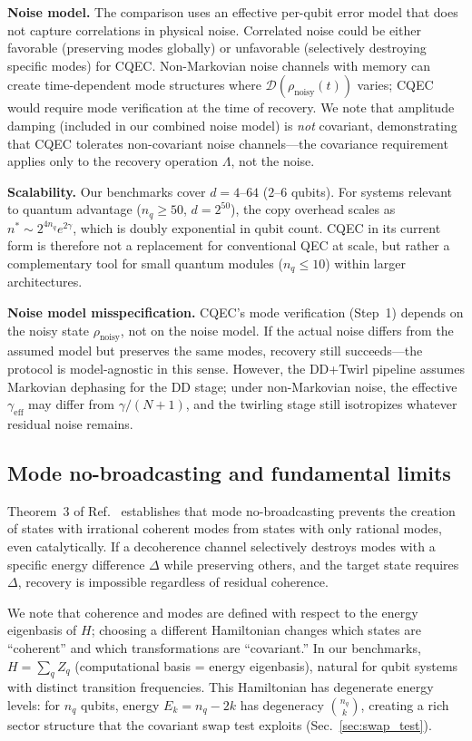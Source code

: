 \documentclass[pra,twocolumn,superscriptaddress,longbibliography,floatfix]{revtex4-2}
\begin{document}
\textbf{Noise model.}
The comparison uses an effective per-qubit error model that does not capture correlations in physical noise.
Correlated noise could be either favorable (preserving modes globally) or unfavorable (selectively destroying specific modes) for CQEC.
Non-Markovian noise channels with memory can create time-dependent mode structures where $\mathcal{D}(\rho_\mathrm{noisy}(t))$ varies; CQEC would require mode verification at the time of recovery.
We note that amplitude damping (included in our combined noise model) is \emph{not} covariant, demonstrating that CQEC tolerates non-covariant noise channels---the covariance requirement applies only to the recovery operation $\Lambda$, not the noise.

\textbf{Scalability.}
Our benchmarks cover $d = 4$--$64$ ($2$--$6$ qubits).
For systems relevant to quantum advantage ($n_q \geq 50$, $d = 2^{50}$), the copy overhead scales as $n^* \sim 2^{4n_q} e^{2\gamma}$, which is doubly exponential in qubit count.
CQEC in its current form is therefore not a replacement for conventional QEC at scale, but rather a complementary tool for small quantum modules ($n_q \leq 10$) within larger architectures.

\textbf{Noise model misspecification.}
CQEC's mode verification (Step~1) depends on the noisy state $\rho_\mathrm{noisy}$, not on the noise model.
If the actual noise differs from the assumed model but preserves the same modes, recovery still succeeds---the protocol is model-agnostic in this sense.
However, the DD+Twirl pipeline assumes Markovian dephasing for the DD stage; under non-Markovian noise, the effective $\gamma_\mathrm{eff}$ may differ from $\gamma/(N+1)$, and the twirling stage still isotropizes whatever residual noise remains.


\subsection{Mode no-broadcasting and fundamental limits}
\label{sec:no_broadcasting}

Theorem~3 of Ref.~\cite{Shiraishi2024} establishes that mode no-broadcasting prevents the creation of states with irrational coherent modes from states with only rational modes, even catalytically.
If a decoherence channel selectively destroys modes with a specific energy difference $\Delta$ while preserving others, and the target state requires $\Delta$, recovery is impossible regardless of residual coherence.

We note that coherence and modes are defined with respect to the energy eigenbasis of $H$; choosing a different Hamiltonian changes which states are ``coherent'' and which transformations are ``covariant.''
In our benchmarks, $H = \sum_q Z_q$ (computational basis = energy eigenbasis), natural for qubit systems with distinct transition frequencies.
This Hamiltonian has degenerate energy levels: for $n_q$ qubits, energy $E_k = n_q - 2k$ has degeneracy $\binom{n_q}{k}$, creating a rich sector structure that the covariant swap test exploits (Sec.~\ref{sec:swap_test}).
\end{document}
